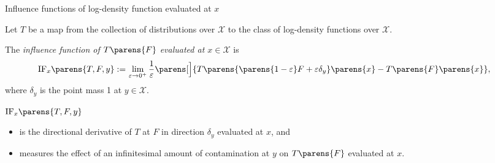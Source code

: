 \documentclass[aspectratio=169,xcolor=dvipsnames]{beamer}
\newcommand{\calX}{\mathcal{X}}
\begin{document}
\begin{frame}{Influence functions of log-density function evaluated at $x$}

	Let $T$ be a map from the collection of distributions over $\calX$ to the class of log-density functions over $\calX$. 
	
	\vspace{10pt}
	
	
	The \textit{influence function of $T \parens{F}$ evaluated at $x \in \calX$} is
	\begin{align}
		\mathrm{IF}_x \parens{T, F, y} := & \, \lim_{\varepsilon \to 0^+} \frac{1}{\varepsilon} \parens[\Big]{ T \parens{ \parens{1 - \varepsilon} F + \varepsilon \delta_y } \parens{x} - T \parens{F} \parens{x} }, %
	\end{align}
	where $\delta_y$ is the point mass 1 at $y \in \calX$. 
	
	\vspace{10pt}
	
	$\mathrm{IF}_x \parens{T, F, y}$
	\begin{itemize}
		\item is the directional derivative of $T$ at $F$ in direction $\delta_y$ evaluated at $x$, and 
		\item measures the effect of an infinitesimal amount of contamination at $y$ on $T \parens{F}$ evaluated at $x$. 
	\end{itemize}
	
\end{frame}


%	
%	
%	
%	
%	
\end{document}
